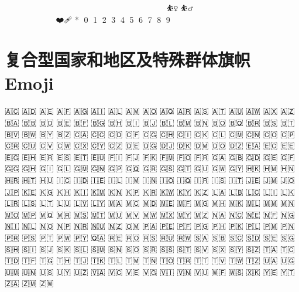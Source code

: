\documentclass{article}
\begin{document}
🧑🏾‍❤️‍🧑🏿 🧑🏾 🧑🏿‍🌾 🧑🏿‍🍳 🧑🏿‍🍼 🧑🏿‍🎄 🧑🏿‍🎓 🧑🏿‍🎤 🧑🏿‍🎨 🧑🏿‍🏫 🧑🏿‍🏭 🧑🏿‍💻 🧑🏿‍💼 🧑🏿‍🔧 🧑🏿‍🔬 🧑🏿‍🚀 🧑🏿‍🚒 🧑🏿‍🤝‍🧑🏻 🧑🏿‍🤝‍🧑🏼 🧑🏿‍🤝‍🧑🏽 🧑🏿‍🤝‍🧑🏾 🧑🏿‍🤝‍🧑🏿 🧑🏿‍🦯‍➡️ 🧑🏿‍🦯 🧑🏿‍🦰 🧑🏿‍🦱 🧑🏿‍🦲 🧑🏿‍🦳 🧑🏿‍🦼‍➡️ 🧑🏿‍🦼 🧑🏿‍🦽‍➡️ 🧑🏿‍🦽 🧑🏿‍⚕️ 🧑🏿‍⚖️ 🧑🏿‍✈️ 🧑🏿‍❤️‍💋‍🧑🏻 🧑🏿‍❤️‍💋‍🧑🏼 🧑🏿‍❤️‍💋‍🧑🏽 🧑🏿‍❤️‍💋‍🧑🏾 🧑🏿‍❤️‍🧑🏻 🧑🏿‍❤️‍🧑🏼 🧑🏿‍❤️‍🧑🏽 🧑🏿‍❤️‍🧑🏾 🧑🏿 🧑‍🌾 🧑‍🍳 🧑‍🍼 🧑‍🎄 🧑‍🎓 🧑‍🎤 🧑‍🎨 🧑‍🏫 🧑‍🏭 🧑‍💻 🧑‍💼 🧑‍🔧 🧑‍🔬 🧑‍🚀 🧑‍🚒 🧑‍🤝‍🧑 🧑‍🦯‍➡️ 🧑‍🦯 🧑‍🦰 🧑‍🦱 🧑‍🦲 🧑‍🦳 🧑‍🦼‍➡️ 🧑‍🦼 🧑‍🦽‍➡️ 🧑‍🦽 🧑‍🧑‍🧒‍🧒 🧑‍🧑‍🧒 🧑‍🧒‍🧒 🧑‍🧒 🧑‍⚕️ 🧑‍⚖️ 🧑‍✈️ 🧒🏻 🧒🏼 🧒🏽 🧒🏾 🧒🏿 🧓🏻 🧓🏼 🧓🏽 🧓🏾 🧓🏿 🧔🏻‍♀️ 🧔🏻‍♂️ 🧔🏻 🧔🏼‍♀️ 🧔🏼‍♂️ 🧔🏼 🧔🏽‍♀️ 🧔🏽‍♂️ 🧔🏽 🧔🏾‍♀️ 🧔🏾‍♂️ 🧔🏾 🧔🏿‍♀️ 🧔🏿‍♂️ 🧔🏿 🧔‍♀️ 🧔‍♂️ 🧕🏻 🧕🏼 🧕🏽 🧕🏾 🧕🏿 🧖🏻‍♀️ 🧖🏻‍♂️ 🧖🏻 🧖🏼‍♀️ 🧖🏼‍♂️ 🧖🏼 🧖🏽‍♀️ 🧖🏽‍♂️ 🧖🏽 🧖🏾‍♀️ 🧖🏾‍♂️ 🧖🏾 🧖🏿‍♀️ 🧖🏿‍♂️ 🧖🏿 🧖‍♀️ 🧖‍♂️ 🧗🏻‍♀️ 🧗🏻‍♂️ 🧗🏻 🧗🏼‍♀️ 🧗🏼‍♂️ 🧗🏼 🧗🏽‍♀️ 🧗🏽‍♂️ 🧗🏽 🧗🏾‍♀️ 🧗🏾‍♂️ 🧗🏾 🧗🏿‍♀️ 🧗🏿‍♂️ 🧗🏿 🧗‍♀️ 🧗‍♂️ 🧘🏻‍♀️ 🧘🏻‍♂️ 🧘🏻 🧘🏼‍♀️ 🧘🏼‍♂️ 🧘🏼 🧘🏽‍♀️ 🧘🏽‍♂️ 🧘🏽 🧘🏾‍♀️ 🧘🏾‍♂️ 🧘🏾 🧘🏿‍♀️ 🧘🏿‍♂️ 🧘🏿 🧘‍♀️ 🧘‍♂️ 🧙🏻‍♀️ 🧙🏻‍♂️ 🧙🏻 🧙🏼‍♀️ 🧙🏼‍♂️ 🧙🏼 🧙🏽‍♀️ 🧙🏽‍♂️ 🧙🏽 🧙🏾‍♀️ 🧙🏾‍♂️ 🧙🏾 🧙🏿‍♀️ 🧙🏿‍♂️ 🧙🏿 🧙‍♀️ 🧙‍♂️ 🧚🏻‍♀️ 🧚🏻‍♂️ 🧚🏻 🧚🏼‍♀️ 🧚🏼‍♂️ 🧚🏼 🧚🏽‍♀️ 🧚🏽‍♂️ 🧚🏽 🧚🏾‍♀️ 🧚🏾‍♂️ 🧚🏾 🧚🏿‍♀️ 🧚🏿‍♂️ 🧚🏿 🧚‍♀️ 🧚‍♂️ 🧛🏻‍♀️ 🧛🏻‍♂️ 🧛🏻 🧛🏼‍♀️ 🧛🏼‍♂️ 🧛🏼 🧛🏽‍♀️ 🧛🏽‍♂️ 🧛🏽 🧛🏾‍♀️ 🧛🏾‍♂️ 🧛🏾 🧛🏿‍♀️ 🧛🏿‍♂️ 🧛🏿 🧛‍♀️ 🧛‍♂️ 🧜🏻‍♀️ 🧜🏻‍♂️ 🧜🏻 🧜🏼‍♀️ 🧜🏼‍♂️ 🧜🏼 🧜🏽‍♀️ 🧜🏽‍♂️ 🧜🏽 🧜🏾‍♀️ 🧜🏾‍♂️ 🧜🏾 🧜🏿‍♀️ 🧜🏿‍♂️ 🧜🏿 🧜‍♀️ 🧜‍♂️ 🧝🏻‍♀️ 🧝🏻‍♂️ 🧝🏻 🧝🏼‍♀️ 🧝🏼‍♂️ 🧝🏼 🧝🏽‍♀️ 🧝🏽‍♂️ 🧝🏽 🧝🏾‍♀️ 🧝🏾‍♂️ 🧝🏾 🧝🏿‍♀️ 🧝🏿‍♂️ 🧝🏿 🧝‍♀️ 🧝‍♂️ 🧞‍♀️ 🧞‍♂️ 🧟‍♀️ 🧟‍♂️ 🫃🏻 🫃🏼 🫃🏽 🫃🏾 🫃🏿 🫄🏻 🫄🏼 🫄🏽 🫄🏾 🫄🏿 🫅🏻 🫅🏼 🫅🏽 🫅🏾 🫅🏿 🫰🏻 🫰🏼 🫰🏽 🫰🏾 🫰🏿 🫱🏻‍🫲🏼 🫱🏻‍🫲🏽 🫱🏻‍🫲🏾 🫱🏻‍🫲🏿 🫱🏻 🫱🏼‍🫲🏻 🫱🏼‍🫲🏽 🫱🏼‍🫲🏾 🫱🏼‍🫲🏿 🫱🏼 🫱🏽‍🫲🏻 🫱🏽‍🫲🏼 🫱🏽‍🫲🏾 🫱🏽‍🫲🏿 🫱🏽 🫱🏾‍🫲🏻 🫱🏾‍🫲🏼 🫱🏾‍🫲🏽 🫱🏾‍🫲🏿 🫱🏾 🫱🏿‍🫲🏻 🫱🏿‍🫲🏼 🫱🏿‍🫲🏽 🫱🏿‍🫲🏾 🫱🏿 🫲🏻 🫲🏼 🫲🏽 🫲🏾 🫲🏿 🫳🏻 🫳🏼 🫳🏽 🫳🏾 🫳🏿 🫴🏻 🫴🏼 🫴🏽 🫴🏾 🫴🏿 🫵🏻 🫵🏼 🫵🏽 🫵🏾 🫵🏿 🫶🏻 🫶🏼 🫶🏽 🫶🏾 🫶🏿 🫷🏻 🫷🏼 🫷🏽 🫷🏾 🫷🏿 🫸🏻 🫸🏼 🫸🏽 🫸🏾 🫸🏿 ☝🏻 ☝🏼 ☝🏽 ☝🏾 ☝🏿 ⛓️‍💥 ⛷🏻 ⛷🏼 ⛷🏽 ⛷🏾 ⛷🏿 ⛹🏻‍♀️ ⛹🏻‍♂️ ⛹🏻 ⛹🏼‍♀️ ⛹🏼‍♂️ ⛹🏼 ⛹🏽‍♀️ ⛹🏽‍♂️ ⛹🏽 ⛹🏾‍♀️ ⛹🏾‍♂️ ⛹🏾 ⛹🏿‍♀️ ⛹🏿‍♂️ ⛹🏿 ⛹️‍♀️ ⛹️‍♂️ ✊🏻 ✊🏼 ✊🏽 ✊🏾 ✊🏿 ✋🏻 ✋🏼 ✋🏽 ✋🏾 ✋🏿 ✌🏻 ✌🏼 ✌🏽 ✌🏾 ✌🏿 ✍🏻 ✍🏼 ✍🏽 ✍🏾 ✍🏿 ❤️‍🔥 ❤️‍🩹 *⃣ 0⃣ 1⃣ 2⃣ 3⃣ 4⃣ 5⃣ 6⃣ 7⃣ 8⃣ 9⃣

\section{复合型国家和地区及特殊群体旗帜 Emoji}

🇦🇨 🇦🇩 🇦🇪 🇦🇫 🇦🇬 🇦🇮 🇦🇱 🇦🇲 🇦🇴 🇦🇶 🇦🇷 🇦🇸 🇦🇹 🇦🇺 🇦🇼 🇦🇽 🇦🇿 🇧🇦 🇧🇧 🇧🇩 🇧🇪 🇧🇫 🇧🇬 🇧🇭 🇧🇮 🇧🇯 🇧🇱 🇧🇲 🇧🇳 🇧🇴 🇧🇶 🇧🇷 🇧🇸 🇧🇹 🇧🇻 🇧🇼 🇧🇾 🇧🇿 🇨🇦 🇨🇨 🇨🇩 🇨🇫 🇨🇬 🇨🇭 🇨🇮 🇨🇰 🇨🇱 🇨🇲 🇨🇳 🇨🇴 🇨🇵 🇨🇷 🇨🇺 🇨🇻 🇨🇼 🇨🇽 🇨🇾 🇨🇿 🇩🇪 🇩🇬 🇩🇯 🇩🇰 🇩🇲 🇩🇴 🇩🇿 🇪🇦 🇪🇨 🇪🇪 🇪🇬 🇪🇭 🇪🇷 🇪🇸 🇪🇹 🇪🇺 🇫🇮 🇫🇯 🇫🇰 🇫🇲 🇫🇴 🇫🇷 🇬🇦 🇬🇧 🇬🇩 🇬🇪 🇬🇫 🇬🇬 🇬🇭 🇬🇮 🇬🇱 🇬🇲 🇬🇳 🇬🇵 🇬🇶 🇬🇷 🇬🇸 🇬🇹 🇬🇺 🇬🇼 🇬🇾 🇭🇰 🇭🇲 🇭🇳 🇭🇷 🇭🇹 🇭🇺 🇮🇨 🇮🇩 🇮🇪 🇮🇱 🇮🇲 🇮🇳 🇮🇴 🇮🇶 🇮🇷 🇮🇸 🇮🇹 🇯🇪 🇯🇲 🇯🇴 🇯🇵 🇰🇪 🇰🇬 🇰🇭 🇰🇮 🇰🇲 🇰🇳 🇰🇵 🇰🇷 🇰🇼 🇰🇾 🇰🇿 🇱🇦 🇱🇧 🇱🇨 🇱🇮 🇱🇰 🇱🇷 🇱🇸 🇱🇹 🇱🇺 🇱🇻 🇱🇾 🇲🇦 🇲🇨 🇲🇩 🇲🇪 🇲🇫 🇲🇬 🇲🇭 🇲🇰 🇲🇱 🇲🇲 🇲🇳 🇲🇴 🇲🇵 🇲🇶 🇲🇷 🇲🇸 🇲🇹 🇲🇺 🇲🇻 🇲🇼 🇲🇽 🇲🇾 🇲🇿 🇳🇦 🇳🇨 🇳🇪 🇳🇫 🇳🇬 🇳🇮 🇳🇱 🇳🇴 🇳🇵 🇳🇷 🇳🇺 🇳🇿 🇴🇲 🇵🇦 🇵🇪 🇵🇫 🇵🇬 🇵🇭 🇵🇰 🇵🇱 🇵🇲 🇵🇳 🇵🇷 🇵🇸 🇵🇹 🇵🇼 🇵🇾 🇶🇦 🇷🇪 🇷🇴 🇷🇸 🇷🇺 🇷🇼 🇸🇦 🇸🇧 🇸🇨 🇸🇩 🇸🇪 🇸🇬 🇸🇭 🇸🇮 🇸🇯 🇸🇰 🇸🇱 🇸🇲 🇸🇳 🇸🇴 🇸🇷 🇸🇸 🇸🇹 🇸🇻 🇸🇽 🇸🇾 🇸🇿 🇹🇦 🇹🇨 🇹🇩 🇹🇫 🇹🇬 🇹🇭 🇹🇯 🇹🇰 🇹🇱 🇹🇲 🇹🇳 🇹🇴 🇹🇷 🇹🇹 🇹🇻 🇹🇼 🇹🇿 🇺🇦 🇺🇬 🇺🇲 🇺🇳 🇺🇸 🇺🇾 🇺🇿 🇻🇦 🇻🇨 🇻🇪 🇻🇬 🇻🇮 🇻🇳 🇻🇺 🇼🇫 🇼🇸 🇽🇰 🇾🇪 🇾🇹 🇿🇦 🇿🇲 🇿🇼 🏴󠁧󠁢󠁥󠁮󠁧󠁿 🏴󠁧󠁢󠁳󠁣󠁴󠁿 🏴󠁧󠁢󠁷󠁬󠁳󠁿 🏳️‍🌈 🏳️‍⚧️ 🏴‍☠️
\end{document}
